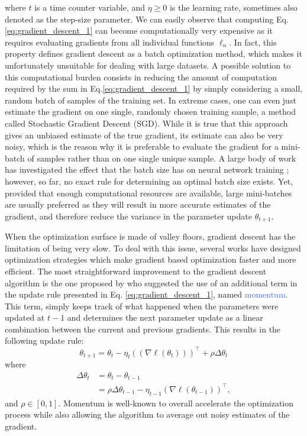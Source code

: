 where $t$ is a time counter variable, and $\eta\geq0$ is the learning rate, sometimes also denoted as the step-size parameter. We can easily observe that computing Eq. \ref{eq:gradient_descent_1} can become computationally very expensive as it requires evaluating gradients from all individual functions $\ell_n$. In fact, this property defines gradient descent as a batch optimization method, which makes it unfortunately unsuitable for dealing with large datasets. A possible solution to this computational burden consists in reducing the amount of computation required by the sum in Eq.\ref{eq:gradient_descent_1} by simply considering a small, random batch of samples of the training set. In extreme cases, one can even just estimate the gradient on one single, randomly chosen training sample, a method called Stochastic Gradient Descent (SGD). While it is true that this approach gives an unbiased estimate of the true gradient, its estimate can also be very noisy, which is the reason why it is preferable to evaluate the gradient for a mini-batch of samples rather than on one single unique sample. A large body of work has investigated the effect that the batch size has on neural network training \cite{keskar2016large,radiuk2017impact,kandel2020effect}; however, so far, no exact rule for determining an optimal batch size exists. Yet, provided that enough computational resources are available, large mini-batches are usually preferred as they will result in more accurate estimates of the gradient, and therefore reduce the variance in the parameter update $\theta_{t+1}$. 

When the optimization surface is made of valley floors, gradient descent has the limitation of being very slow. To deal with this issue, several works have designed optimization strategies which make gradient based optimization faster and more efficient. The most straightforward improvement to the gradient descent algorithm is the one proposed by \citet{rumelhart1986learning} who suggested the use of an additional term in the update rule presented in Eq. \ref{eq:gradient_descent_1}, named \textcolor{RoyalBlue}{momentum}. This term, simply keeps track of what happened when the parameters were updated at $t-1$ and determines the next parameter update as a linear combination between the current and previous gradients. This results in the following update rule:
\begin{equation}
	\theta_{t+1} = \theta_t - \eta_t ((\nabla \ell(\theta_t)))^{\intercal} + \rho\Delta\theta_t
	\label{eq: momentum}
\end{equation}
where  
\begin{equation}
	\begin{split}
	\Delta\theta_{t} & = \theta_t - \theta_{t-1} \\ 
		   & = 
\rho\Delta\theta_{t-1}-\eta_{t-1}(\nabla \ell(\theta_{t-1}))^{\intercal},
	\end{split}
\label{eq:gradient_descent}
\end{equation}
and $\rho\in[0,1]$. Momentum is well-known to overall accelerate the optimization process while also allowing the algorithm to average out noisy estimates of the gradient.

